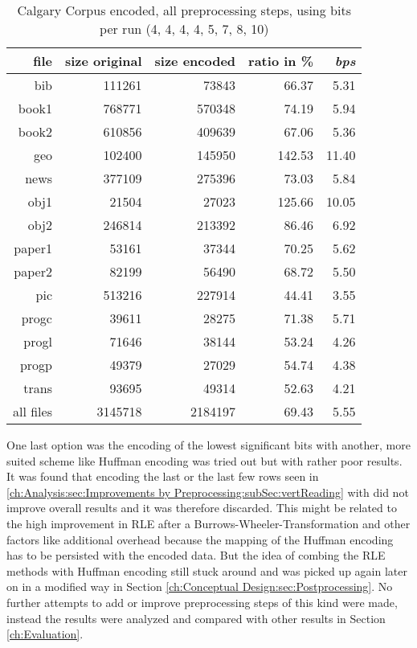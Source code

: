 {\par{
\begin{table}[h]
	\centering
	\begin{tabular}{r|r|r|r|r}	
		file & size original & size encoded & ratio in \% & \textit{bps}\\
		\hline
		bib & 111261 & 73843 & 66.37 & 5.31 \\
		book1 & 768771 & 570348 & 74.19 & 5.94 \\
		book2 & 610856 & 409639 & 67.06 & 5.36 \\
		geo & 102400 & 145950 & 142.53 & 11.40 \\
		news & 377109 & 275396 & 73.03 & 5.84 \\
		obj1 & 21504 & 27023 & 125.66 & 10.05 \\
		obj2 & 246814 & 213392 & 86.46 & 6.92 \\
		paper1 & 53161 & 37344 & 70.25 & 5.62 \\
		paper2 & 82199 & 56490 & 68.72 & 5.50 \\
		pic & 513216 & 227914 & 44.41 & 3.55 \\
		progc & 39611 & 28275 & 71.38 & 5.71 \\
		progl & 71646 & 38144 & 53.24 & 4.26 \\
		progp & 49379 & 27029 & 54.74 & 4.38 \\
		trans & 93695 & 49314 & 52.63 & 4.21 \\
		\hline
		all files & 3145718 & 2184197 & 69.43 & 5.55
	\end{tabular}
	\caption{Calgary Corpus encoded, all preprocessing steps, using bits per run (4, 4, 4, 4, 5, 7, 8, 10)}
	\label{tab:t5:Calgary Corpus encoded, all preprocessing steps, using bits per run: 4, 4,4, 4, 5, 7, 8, 10}
\end{table}

\par{
One last option was the encoding of the lowest significant bits with another, more suited scheme like Huffman encoding was tried out but with rather poor results. It was found that encoding the last or the last few rows seen in \ref{ch:Analysis:sec:Improvements by Preprocessing:subSec:vertReading} with did not improve overall results and it was therefore discarded. This might be related to the high improvement in RLE after a Burrows-Wheeler-Transformation and other factors like additional overhead because the mapping of the Huffman encoding has to be persisted with the encoded data. But the idea of combing the RLE methods with Huffman encoding still stuck around and was picked up again later on in a modified way in Section \ref{ch:Conceptual Design:sec:Postprocessing}. No further attempts to add or improve preprocessing steps of this kind were made, instead the results were analyzed and compared with other results in Section \ref{ch:Evaluation}.
}
}}
